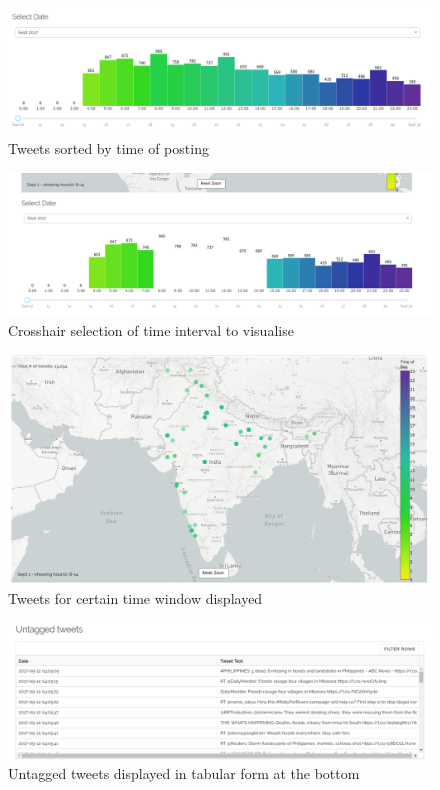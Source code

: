 \documentclass[journal, a4paper]{IEEEtran}
\begin{document}
\begin{figure}[h!]
	\centering
	\includegraphics[width=\columnwidth]{bar_chart.png}
	\caption{Tweets sorted by time of posting}
	\label{fig:barchart}
\end{figure}


\begin{figure}[h!]
	\centering
	\includegraphics[width=\columnwidth]{bar_chart_specific.png}
	\caption{Crosshair selection of time interval to visualise}
	\label{fig:barchart_specific}
\end{figure}


\begin{figure}[h!]
	\centering
	\includegraphics[width=\columnwidth]{map_specific.png}
	\caption{ Tweets for certain time window displayed}
	\label{fig:map_specific}
\end{figure}

\begin{figure}[h!]
	\centering
	\includegraphics[width=\columnwidth]{untagged.png}
	\caption{Untagged tweets displayed in tabular form at the bottom}
	\label{fig:untagged}
\end{figure}
\end{document}

